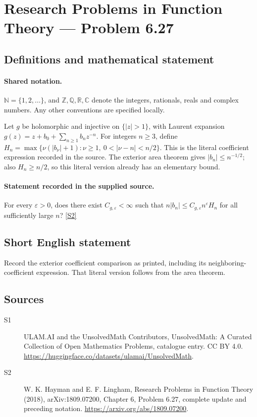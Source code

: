 \documentclass[11pt]{article}
\newcommand{\sref}[2]{\hyperlink{source:#1:#2}{[S#2]}}
\begin{document}
\section{Research Problems in Function Theory — Problem 6.27}\label{statement}

\subsection{Definitions and mathematical statement}

\paragraph{Shared notation.}$\mathbb N=\{1,2,\ldots\}$, and $\mathbb Z,\mathbb Q,\mathbb R,\mathbb C$ denote the integers, rationals, reals and complex numbers. Any other conventions are specified locally.


Let $g$ be holomorphic and injective on $\{|z|>1\}$, with Laurent expansion $g(z)=z+b_0+\sum_{n\ge1}b_nz^{-n}$. For integers $n\ge3$, define $H_n=\max\{\nu(|b_\nu|+1):\nu\ge1,\ 0<|\nu-n|<n/2\}$. This is the literal coefficient expression recorded in the source. The exterior area theorem gives $|b_n|\le n^{-1/2}$; also $H_n\ge n/2$, so this literal version already has an elementary bound.
\paragraph{Statement recorded in the supplied source.}
For every $\varepsilon>0$, does there exist $C_{g,\varepsilon}<\infty$ such that $n|b_n|\le C_{g,\varepsilon}n^\varepsilon H_n$ for all sufficiently large $n$? \sref{statement}{2}
\subsection{Short English statement}
Record the exterior coefficient comparison as printed, including its neighboring-coefficient expression. That literal version follows from the area theorem.
\subsection{Sources}
\begin{description}
\item[\hypertarget{source:statement:1}{S1}] ULAM.AI and the UnsolvedMath Contributors, UnsolvedMath: A Curated Collection of Open Mathematics Problems, catalogue entry. CC BY 4.0. \url{https://huggingface.co/datasets/ulamai/UnsolvedMath}.
\item[\hypertarget{source:statement:2}{S2}] W. K. Hayman and E. F. Lingham, Research Problems in Function Theory (2018), arXiv:1809.07200, Chapter 6, Problem 6.27, complete update and preceding notation. \url{https://arxiv.org/abs/1809.07200}.
\end{description}
\label{end:statement}
\end{document}
